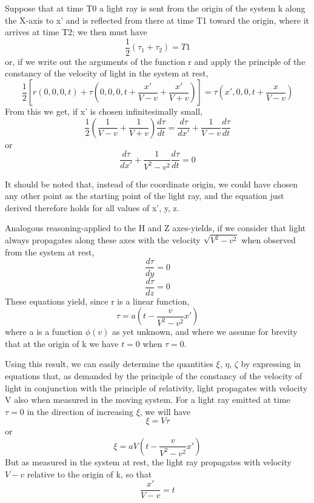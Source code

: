 ﻿\documentclass{article} %
\begin{document}
Suppose that at time T0 a light ray is sent from the origin of the system k along the X-axis to x' and is reflected from there at time T1 toward the origin, where it arrives at time T2; we then must have  
\begin{equation} \frac{1}{2}(\tau_1+\tau_2)=T1 \nonumber\end{equation}
 or, if we write out the arguments of the function r and apply the principle of the constancy of the velocity of light in the system at rest, 
\begin{equation} \frac{1}{2}\left[r(0,0,0,t)+\tau(0,0,0,t+\frac{x'}{V-v}+\frac{x'}{V+v})\right]=\tau(x',0,0,t+\frac{x}{V-v}) \nonumber\end{equation}
From this we get, if x' is chosen infinitesimally small, 
\begin{equation} \frac{1}{2}\left(\frac{1}{V-v}+\frac{1}{V+v}\right) \frac{d\tau}{dt}=\frac{d\tau}{dx'}+\frac{1}{V-v}\frac{d\tau}{dt} \nonumber\end{equation}
 or 
\begin{equation}   \frac{d\tau}{dx'}+\frac{1}{V^2-v^2}\frac{d\tau}{dt}=0 \nonumber\end{equation}

It should be noted that, instead of the coordinate origin, we could have chosen any other point as the starting point of the light ray, and the equation just derived therefore holds for all values of x', y, z. 

Analogous reasoning-applied to the H and Z axes-yields, if we consider that light always propagates along these axes with the velocity $\sqrt{V^2-v^2}$ when observed from the system at rest, 
\begin{equation} \frac{d\tau}{dy}=0 \nonumber\end{equation}
\begin{equation} \frac{d\tau}{dz}=0 \nonumber\end{equation}
These equations yield, since r is a linear function, 
\begin{equation} \tau=a(t-\frac{v}{V^2-v^2}x') \nonumber\end{equation} 
where a is a function $\phi(v)$ as yet unknown, and where we assume for brevity that at the origin of k we have $t=0$ when $\tau= 0$. 

Using this result, we can easily determine the quantities $\xi$, $\eta$, $\zeta$ by expressing in equations that, as demanded by the principle of the constancy of the velocity of light in conjunction with the principle of relativity, light propagates with velocity V also when measured in the moving system. 
For a light ray emitted at time $\tau=0$ in the direction of increasing $\xi$, we will have 
\begin{equation} \xi=V\tau \nonumber\end{equation} 
or 
\begin{equation} \xi=aV\left(t-\frac{v}{V^2-v^2}x'\right) \nonumber\end{equation}
But as measured in the system at rest, the light ray propagates with velocity $V-v$ relative to the origin of k, so that 
\begin{equation} \frac{x'}{V-v}=t \nonumber\end{equation} 
\end{document}
